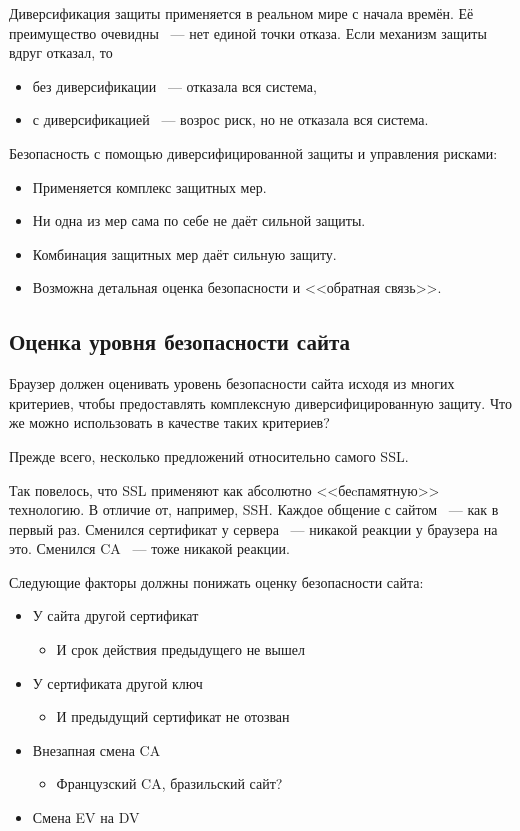 \documentclass[10pt, a5paper]{article}
\begin{document}
Диверсификация защиты применяется в реальном мире с начала времён. Её
преимущество очевидны ~--- нет единой точки отказа. Если механизм защиты
вдруг отказал, то

\begin{itemize}
  \item без диверсификации ~--- отказала вся система,
  \item с диверсификацией ~--- возрос риск, но не отказала вся система.
\end{itemize}

Безопасность с помощью диверсифицированной защиты и управления рисками:

\begin{itemize}
  \item Применяется комплекс защитных мер.
  \item Ни одна из мер сама по себе не даёт сильной защиты.
  \item Комбинация защитных мер даёт сильную защиту.
  \item Возможна детальная оценка безопасности и <<обратная связь>>.
\end{itemize}

\subsection*{Оценка уровня безопасности сайта}

Браузер должен оценивать уровень безопасности сайта исходя из многих
критериев, чтобы предоставлять комплексную диверсифицированную
защиту. Что же можно использовать в качестве таких критериев?

Прежде всего, несколько предложений относительно самого SSL.

Так повелось, что SSL применяют как абсолютно <<беcпамятную>>
технологию. В отличие от, например, SSH. Каждое общение с сайтом ~--- как
в первый раз. Сменился сертификат у сервера ~--- никакой реакции у
браузера на это. Сменился CA ~--- тоже никакой реакции.

Следующие факторы должны понижать оценку безопасности сайта:

\begin{itemize}
  \item У сайта другой сертификат\begin{itemize}
  \item И срок действия предыдущего не вышел
\end{itemize}


  \item У сертификата другой ключ\begin{itemize}
  \item И предыдущий сертификат не отозван
\end{itemize}


  \item Внезапная смена CA\begin{itemize}
  \item Французский CA, бразильский сайт?
\end{itemize}


  \item Смена EV на DV
\end{itemize}
\end{document}
